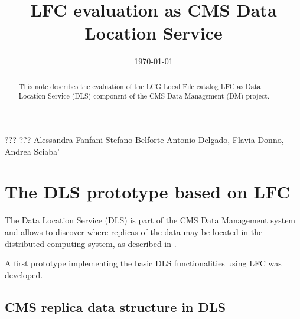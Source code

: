 \documentclass[pdftex]{cmspaper}
\begin{document}

\begin{titlepage}

   \date{\today}

  \title{LFC evaluation as CMS Data Location Service}


  \begin{Authlist}
    ??? ???
    Alessandra Fanfani
    Stefano Belforte
    Antonio Delgado, Flavia Donno, Andrea Sciaba' 

  \end{Authlist}


  \begin{abstract}

    This note describes the evaluation of the LCG Local File catalog LFC as Data Location Service (DLS) component
    of the CMS Data Management (DM) project. 
\end{abstract} 

  
\end{titlepage}

\setcounter{page}{2}%
\tableofcontents



\section{The DLS prototype based on LFC}
\label{sec:proto0}

 The Data Location Service (DLS) is part of the CMS Data Management system and allows to discover
 where replicas of the data may be located in the distributed computing system, as described in \cite{DLS}.  

 A first prototype implementing the basic DLS functionalities using LFC was developed.  

\subsection{CMS replica data structure in DLS}
\end{document}
